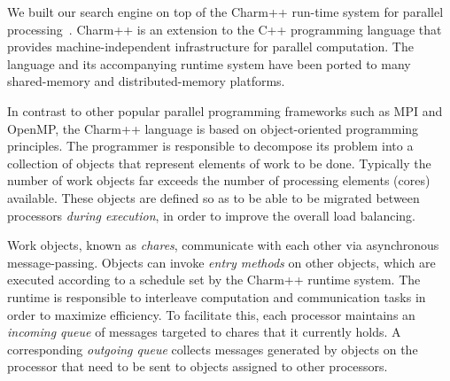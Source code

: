 \documentclass[times, 10pt,twocolumn]{article}
\begin{document}
\begin{figure}[htpb]
\small
\begin{boxedminipage}{\columnwidth}
\begin{algorithmic}[1]
  \EndIf
\EndFunction
\label{codelisting}
\end{algorithmic}
\end{boxedminipage}
\end{figure}

\label{ParSSSE}
We built our search engine on top of the {\sc Charm++} run-time
system for parallel processing~\cite{kale93charm,kale09charm}.  {\sc Charm++}
is an extension to the C++ programming language that provides
machine-independent infrastructure for parallel computation.  The language and
its accompanying runtime system have been ported to many shared-memory and
distributed-memory platforms.

In contrast to other popular parallel programming frameworks such as {\sc MPI}
and {\sc OpenMP}, the {\sc Charm++} language is based on object-oriented
programming principles.  The programmer is responsible to decompose its problem
into a collection of objects that represent elements of work to be done.
Typically the number of work objects far exceeds the number of processing
elements (cores) available.  These objects are defined so as to be able to be
migrated between processors {\em during execution}, in order to improve the
overall load balancing.  

Work objects, known as {\em chares}, communicate with each other via
asynchronous message-passing.  Objects can invoke {\em entry methods} on other
objects, which are executed according to a schedule set by the {\sc Charm++}
runtime system.  The runtime is responsible to interleave computation and
communication tasks in order to maximize efficiency.  To facilitate this, each
processor maintains an {\em incoming queue} of messages targeted to chares that
it currently holds.  A corresponding {\em outgoing queue} collects messages
generated by objects on the processor that need to be sent to objects assigned
to other processors.
\end{document}
